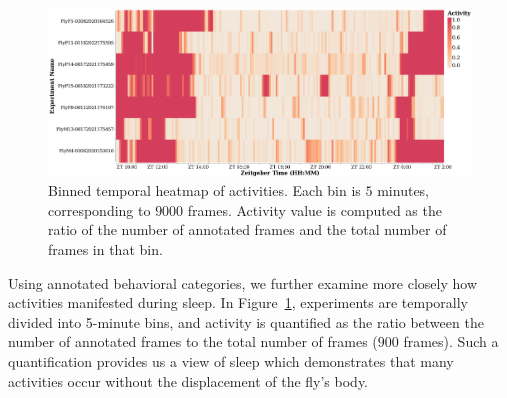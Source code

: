 \begin{figure}[b!]
	\centering\includegraphics[width=0.95\linewidth]{figures/ActivityBinned-Ann-WT-5T.pdf}
	\caption[Binned temporal heatmap of activities.]{Binned temporal heatmap of activities.
		Each bin is $5$ minutes, corresponding to $9000$ frames.
		Activity value is computed as the ratio of the number of annotated frames and the total number of frames in that bin. \label{figure:heatmap-microactivity}}
\end{figure}

Using annotated behavioral categories, we further examine more closely how activities manifested during sleep.
In Figure~\ref{figure:heatmap-microactivity}, experiments are temporally divided into 5-minute bins, and activity is quantified as the ratio between the number of annotated frames to the total number of frames ($900$ frames). Such a quantification provides us a view of sleep which demonstrates that many activities occur without the displacement of the fly's body.

